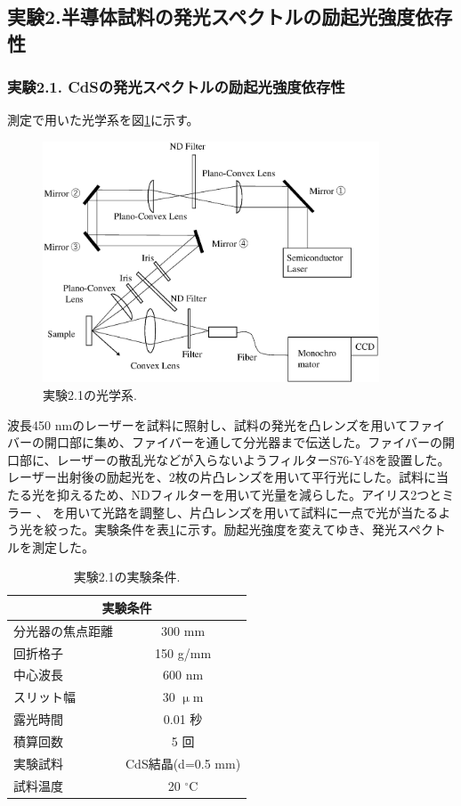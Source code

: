 \documentclass[11pt,a4j]{jsarticle}
\newlength{\circleboxwdht}
\newcommand{\centercircle}[1]{%
  \setlength{\circleboxwdht}{\wd\circlebox}%
  \addtolength{\circleboxwdht}{\dp\circlebox}%
  \raisebox{0.4\dp\circlebox}{%
    \parbox[][\circleboxwdht][c]{\wd\circlebox}{\centering#1}}%
  \llap{\usebox{\circlebox}}%
}	%
\begin{document}
\newpage
\subsection{実験2.半導体試料の発光スペクトルの励起光強度依存性}
\subsubsection{実験2.1. CdSの発光スペクトルの励起光強度依存性}

測定で用いた光学系を図\ref{fig_system2}に示す。

\begin{figure}[h]
 \centering
 \includegraphics[clip,width=10cm]{start_system2.eps}
 \caption{実験2.1の光学系.}
 \label{fig_system2}
\end{figure}

波長450 nmのレーザーを試料に照射し、試料の発光を凸レンズを用いてファイバーの開口部に集め、ファイバーを通して分光器まで伝送した。ファイバーの開口部に、レーザーの散乱光などが入らないようフィルターS76-Y48を設置した。レーザー出射後の励起光を、2枚の片凸レンズを用いて平行光にした。試料に当たる光を抑えるため、NDフィルターを用いて光量を減らした。アイリス2つとミラー\centercircle{1}、\centercircle{2}を用いて光路を調整し、片凸レンズを用いて試料に一点で光が当たるよう光を絞った。実験条件を表\ref{col_2.1}に示す。励起光強度を変えてゆき、発光スペクトルを測定した。

\begin{table}[ht]
 \centering
 \caption{実験2.1の実験条件.}
 \begin{tabular}{lc}\hline
  \multicolumn{2}{c}{実験条件}         \\ \hline
  分光器の焦点距離 & 300 mm            \\
  回折格子         & 150 g/mm          \\
  中心波長         & 600 nm            \\
  スリット幅       & 30 $\upmu$m       \\
  露光時間         & 0.01 秒           \\
  積算回数         & 5 回              \\
  実験試料         & CdS結晶(d=0.5 mm) \\
  試料温度         & 20 ${}^\circ$C    \\ \hline
 \end{tabular}
 \label{col_2.1}
\end{table}
\end{document}
